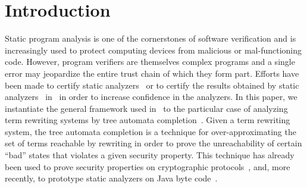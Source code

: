 \section{Introduction}
\label{sec:introduction}



Static program analysis is one of the cornerstones of software
verification and is increasingly used to protect computing devices
from malicious or mal-functioning code. However, program verifiers are
themselves complex programs and a single error may jeopardize the
entire trust chain of which they form part. 
Efforts have been made to certify static
analyzers~\cite{KleinN-TCS03,BartheD-FASE04,CacheraJPR-TCS05} or to certify the results obtained by static
analyzers~\cite{LetouzeyT-TPHOL00,BessonJP-TCS06} in \coq\ in order to increase confidence
in the analyzers. 
In this paper, we instantiate the general framework used
in~\cite{BessonJP-TCS06} to the particular case of analyzing term
rewriting systems by  tree automata
completion~\cite{Genet-RTA98,FeuilladeGVTT-JAR04}. Given a term rewriting
system, the tree automata completion is a technique for over-approximating the
set of terms reachable by rewriting in order to prove the
unreachability of certain ``bad'' states that violates a given
security property. This technique has already been used to
prove security properties on cryptographic protocols~\cite{GenetK-CADE00},
\cite{GenetTTVTT-wits03,BoichutHKO-AVIS04,avispa,ZuninoD-FOSSACS06} and, more
recently, to prototype static analyzers on Java byte
code~\cite{BoichutGJL-RTA07}.

